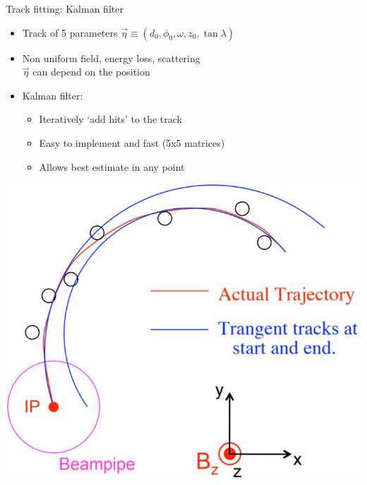\documentclass[10pt]{beamer}
\begin{document}
%
\begin{frame}{Track fitting: Kalman filter}

\noindent
\begin{minipage}{.6\textwidth}
	\begin{itemize}
	\setlength\itemsep{0.4cm}
	\item Track of 5 parameters ${\vec{\eta}} \equiv ( d_0, \phi_0, \omega, z_0, \tan \lambda)$
	\item Non uniform field, energy loss, scattering \\${\vec{\eta}}$ can depend on the position 
	\item Kalman filter: 
	\begin{itemize}
	\setlength\itemsep{0.2cm}
	\item Iteratively `add hits' to the track
	\item Easy to implement and fast (5x5 matrices)
	\item Allows best estimate in any point
	\end{itemize}
	\end{itemize}
\end{minipage}
\begin{minipage}{0.35\textwidth}
    \centering
	\includegraphics[width=1\textwidth]{Kutschke_Kalman_circ}
\end{minipage}
\end{frame}
\end{document}

